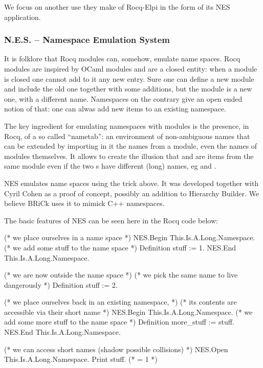 \documentclass[a4paper, 11pt]{book}
\begin{document}
We focus on another use they make of Rocq-Elpi in the form of its
NES application.

\subsubsection{N.E.S. -- Namespace Emulation System}

It is folklore that Rocq modules can, somehow, emulate name spaces.
Rocq modules are inspired by OCaml modules and are a closed entity: when
a module is closed one cannot add to it any new entry. Sure one can
define a new module and include the old one together with some additions,
but the module is a new one, with a different name. Namespaces on the
contrary give an open ended notion of that: one can alwas add new items
to an existing namespace.

The key ingredient for emulating namespaces with modules is the presence,
in Rocq, of a so called ``nametab'': an environment of non-ambiguous names
that can be extended by importing in it the names from a module, even the
names of modules themselves. It allows to create the illusion that 
and  are items from the same module  even if
the two s have different (long) names, eg 
and .

NES emulates name spaces using the trick above. It was developed
together with Cyril Cohen as a proof of concept, possibly an addition
to Hierarchy Builder. We believe BRiCk uses it to mimick C++ namespaces.

The basic features of NES can be seen here in the Rocq code below:

\begin{rocqcode}
(* we place ourselves in a name space *)
NES.Begin This.Is.A.Long.Namespace.
  (* we add some stuff to the name space *)
  Definition stuff := 1.
NES.End This.Is.A.Long.Namespace.

(* we are now outside the name space *)
(* we pick the same name to live dangerously *)
Definition stuff := 2.

(* we place ourselves back in an existing namespace, *)
(* its contents are accessible via their short name *)
NES.Begin This.Is.A.Long.Namespace.
  (* we add some more stuff to the name space *)
  Definition more_stuff := stuff.
NES.End This.Is.A.Long.Namespace.

(* we can access short names (shadow possible collisions) *)
NES.Open This.Is.A.Long.Namespace.
Print stuff. (* = 1 *)
\end{rocqcode}
\end{document}
